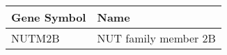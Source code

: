 \begin{tabular}{ll}
\toprule
Gene Symbol &                 Name \\
\midrule
     NUTM2B & NUT family member 2B \\
\bottomrule
\end{tabular}
